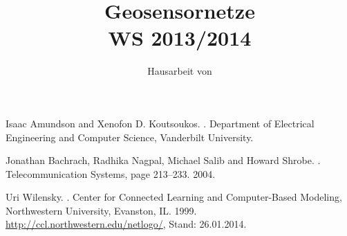 \documentclass[
	pdftex,
	a4paper,
	oneside,		%
	BCOR12mm,       %
	11pt,			%
	parskip=half,	%
	headsepline,	%
	ngerman		    %
]{scrreprt}
\title{\textbf{Geosensornetze}\\WS 2013/2014}
\author{Hausarbeit von\\\autor}
\begin{document}
\parindent 0pt
\parskip 6pt

\maketitle
\tableofcontents
\parindent 0pt






%


\clearpage
\setcounter{page}{1}

\begin{thebibliography}{123}

Isaac Amundson and Xenofon D. Koutsoukos.
.
\newblock Department of Electrical Engineering and Computer Science, Vanderbilt University.


{Jonathan Bachrach}, {Radhika Nagpal}, {Michael Salib} and {Howard Shrobe}.
.
\newblock Telecommunication Systems, page 213--233. 2004.

Uri Wilensky.
. 
\newblock Center for Connected Learning and Computer-Based Modeling, Northwestern University, Evanston, IL. 1999.
\newblock \url{http://ccl.northwestern.edu/netlogo/}, Stand: 26.01.2014.

\end{thebibliography}

\end{document}
